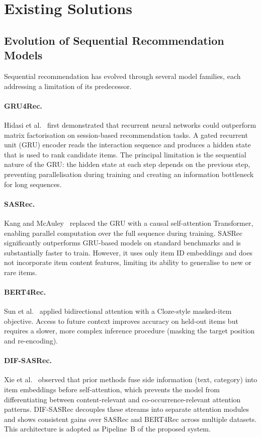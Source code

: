 \section{Existing Solutions}
\label{sec:existing_solutions}

\subsection{Evolution of Sequential Recommendation Models}

Sequential recommendation has evolved through several model families, each addressing a limitation of its predecessor.

\paragraph{GRU4Rec.}
Hidasi et al.~\cite{hidasi2016gru4rec} first demonstrated that recurrent neural networks could outperform matrix factorisation on session-based recommendation tasks.
A gated recurrent unit (GRU) encoder reads the interaction sequence and produces a hidden state that is used to rank candidate items.
The principal limitation is the sequential nature of the GRU: the hidden state at each step depends on the previous step, preventing parallelisation during training and creating an information bottleneck for long sequences.

\paragraph{SASRec.}
Kang and McAuley~\cite{kang2018self} replaced the GRU with a causal self-attention Transformer, enabling parallel computation over the full sequence during training.
SASRec significantly outperforms GRU-based models on standard benchmarks and is substantially faster to train.
However, it uses only item ID embeddings and does not incorporate item content features, limiting its ability to generalise to new or rare items.

\paragraph{BERT4Rec.}
Sun et al.~\cite{sun2019bert4rec} applied bidirectional attention with a Cloze-style masked-item objective.
Access to future context improves accuracy on held-out items but requires a slower, more complex inference procedure (masking the target position and re-encoding).

\paragraph{DIF-SASRec.}
Xie et al.~\cite{xie2022difsasrec} observed that prior methods fuse side information (text, category) into item embeddings before self-attention, which prevents the model from differentiating between content-relevant and co-occurrence-relevant attention patterns.
DIF-SASRec decouples these streams into separate attention modules and shows consistent gains over SASRec and BERT4Rec across multiple datasets.
This architecture is adopted as Pipeline~B of the proposed system.

